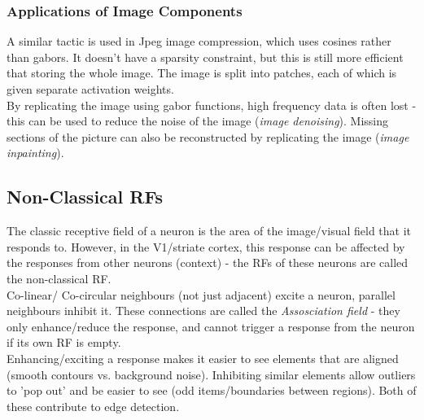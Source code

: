 \subsubsection{Applications of Image Components}
A similar tactic is used in Jpeg image compression, which uses cosines rather than gabors. It doesn't have a sparsity constraint, but this is still more efficient that storing the whole image. The image is split into patches, each of which is given separate activation weights. \\

By replicating the image using gabor functions, high frequency data is often lost - this can be used to reduce the noise of the image (\emph{image denoising}). Missing sections of the picture can also be reconstructed by replicating the image (\emph{image inpainting}). 

\subsection{Non-Classical RFs}
The classic receptive field of a neuron is the area of the image/visual field that it responds to. However, in the V1/striate cortex, this response can be affected by the responses from other neurons (context) - the RFs of these neurons are called the non-classical RF. \\

Co-linear/ Co-circular neighbours (not just adjacent) excite a neuron, parallel neighbours inhibit it. These connections are called the \emph{Assosciation field} - they only enhance/reduce the response, and cannot trigger a response from the neuron if its own RF is empty. \\

Enhancing/exciting a response makes it easier to see elements that are aligned (smooth contours vs. background noise). Inhibiting similar elements allow outliers to 'pop out' and be easier to see (odd items/boundaries between regions). Both of these contribute to edge detection.  